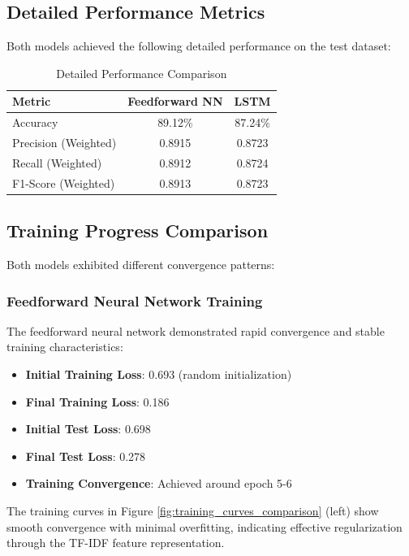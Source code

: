 \documentclass[a4paper, journal]{IEEEtran}
\begin{document}
\subsection{Detailed Performance Metrics}

Both models achieved the following detailed performance on the test dataset:

\begin{table}[ht]
\centering
\begin{tabular}{@{}lcc@{}}
\toprule
\textbf{Metric} & \textbf{Feedforward NN} & \textbf{LSTM} \\
\midrule
Accuracy & 89.12\% & 87.24\% \\
Precision (Weighted) & 0.8915 & 0.8723 \\
Recall (Weighted) & 0.8912 & 0.8724 \\
F1-Score (Weighted) & 0.8913 & 0.8723 \\
\bottomrule
\end{tabular}
\caption{Detailed Performance Comparison}
\label{tab:detailed_performance}
\end{table}

\subsection{Training Progress Comparison}

Both models exhibited different convergence patterns:

\subsubsection{Feedforward Neural Network Training}

The feedforward neural network demonstrated rapid convergence and stable training characteristics:

\begin{itemize}
    \item \textbf{Initial Training Loss}: 0.693 (random initialization)
    \item \textbf{Final Training Loss}: 0.186
    \item \textbf{Initial Test Loss}: 0.698
    \item \textbf{Final Test Loss}: 0.278
    \item \textbf{Training Convergence}: Achieved around epoch 5-6
\end{itemize}

The training curves in Figure \ref{fig:training_curves_comparison} (left) show smooth convergence with minimal overfitting, indicating effective regularization through the TF-IDF feature representation.
\end{document}
